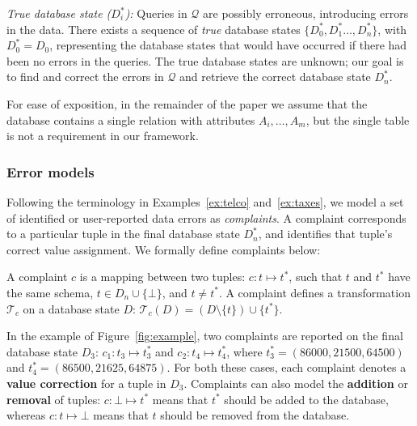 \smallskip
\noindent
\emph{True database state ($D_i^*$):}
Queries in $\mathcal{Q}$ are possibly erroneous, introducing errors in the
data. There exists a sequence of \emph{true} database states $\{D_0^*,
D_1^*\dots, D_n^*\}$, with $D_0^*=D_0$, representing the database states that
would have occurred if there had been no errors in the queries.
The true database states are unknown; our goal is to find and correct the errors in $\mathcal{Q}$ and retrieve the correct database state $D_n^*$.

For ease of exposition, in the remainder of the paper we assume that the
database contains a single relation with attributes $A_i,\ldots,A_m$,
but the single table is not a requirement in our framework.


\subsubsection*{Error models}

Following the terminology in Examples~\ref{ex:telco}
and~\ref{ex:taxes}, we model a set of identified or user-reported
data errors as \emph{complaints}. A complaint corresponds to a
particular tuple in the final database state $D_n^*$, and identifies
that tuple's correct value assignment. We formally define complaints
below:

\begin{definition}[Complaint]
    A complaint $c$ is a mapping between two tuples: $c: t\mapsto t^*$, such that $t$ and $t^*$ have the same schema, $t\in D_n\cup\{\bot\}$, and $t\neq t^*$. A complaint defines a
    transformation $\mathcal{T}_c$ on a database state $D$: $\mathcal{T}_c(D)
    = (D\setminus\{t\})\cup\{t^*\}$.
\end{definition}

In the example of Figure~\ref{fig:example}, two complaints are reported on the final database state $D_3$: 
$c_1: t_3\mapsto t_3^*$ and
$c_2: t_4\mapsto t_4^*$, 
where $t_3^*=(86000,21500,64500)$ and $t_4^*=(86500,21625,64875)$. 
For both these cases, each complaint denotes a \textbf{value correction} for a tuple in $D_3$.  Complaints can also model the \textbf{addition} or \textbf{removal} of tuples: $c: \bot\mapsto t^*$ means that $t^*$ should be added to the database, whereas $c: t\mapsto \bot$
means that $t$ should be removed from the database.


